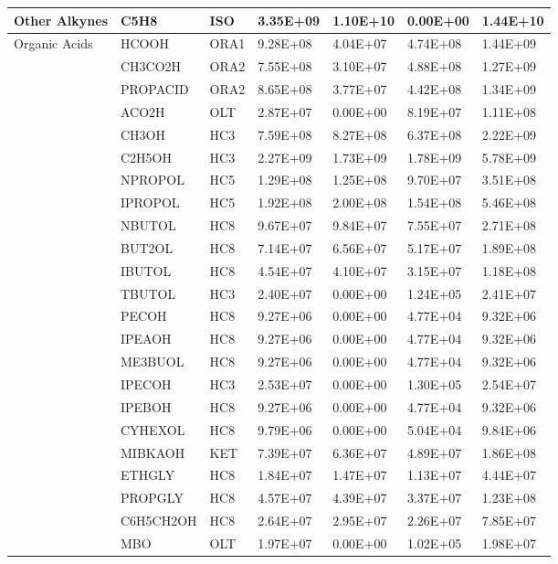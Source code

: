 \begin{longtable}{lllllll}
	Other Alkynes & C5H8 & ISO & 3.35E+09 & 1.10E+10 & 0.00E+00 & 1.44E+10 \\
	\hline \multirow{4}{*}{Organic Acids} & HCOOH & ORA1 & 9.28E+08 & 4.04E+07 & 4.74E+08 & 1.44E+09 \\*
	 & CH3CO2H & ORA2 & 7.55E+08 & 3.10E+07 & 4.88E+08 & 1.27E+09 \\*
	 & PROPACID & ORA2 & 8.65E+08 & 3.77E+07 & 4.42E+08 & 1.34E+09 \\
	 & ACO2H & OLT & 2.87E+07 & 0.00E+00 & 8.19E+07 & 1.11E+08 \\
	\hline \parbox[t]{2mm}{} & CH3OH & HC3 & 7.59E+08 & 8.27E+08 & 6.37E+08 & 2.22E+09 \\
	 & C2H5OH & HC3 & 2.27E+09 & 1.73E+09 & 1.78E+09 & 5.78E+09 \\
	 & NPROPOL & HC5 & 1.29E+08 & 1.25E+08 & 9.70E+07 & 3.51E+08 \\
	 & IPROPOL & HC5 & 1.92E+08 & 2.00E+08 & 1.54E+08 & 5.46E+08 \\
	 & NBUTOL & HC8 & 9.67E+07 & 9.84E+07 & 7.55E+07 & 2.71E+08 \\
	 & BUT2OL & HC8 & 7.14E+07 & 6.56E+07 & 5.17E+07 & 1.89E+08 \\
	 & IBUTOL & HC8 & 4.54E+07 & 4.10E+07 & 3.15E+07 & 1.18E+08 \\
	 & TBUTOL & HC3 & 2.40E+07 & 0.00E+00 & 1.24E+05 & 2.41E+07 \\
	 & PECOH & HC8 & 9.27E+06 & 0.00E+00 & 4.77E+04 & 9.32E+06 \\
	 & IPEAOH & HC8 & 9.27E+06 & 0.00E+00 & 4.77E+04 & 9.32E+06 \\
	 & ME3BUOL & HC8 & 9.27E+06 & 0.00E+00 & 4.77E+04 & 9.32E+06 \\
	 & IPECOH & HC3 & 2.53E+07 & 0.00E+00 & 1.30E+05 & 2.54E+07 \\
	 & IPEBOH & HC8 & 9.27E+06 & 0.00E+00 & 4.77E+04 & 9.32E+06 \\
	 & CYHEXOL & HC8 & 9.79E+06 & 0.00E+00 & 5.04E+04 & 9.84E+06 \\
	 & MIBKAOH & KET & 7.39E+07 & 6.36E+07 & 4.89E+07 & 1.86E+08 \\
	 & ETHGLY & HC8 & 1.84E+07 & 1.47E+07 & 1.13E+07 & 4.44E+07 \\
	 & PROPGLY & HC8 & 4.57E+07 & 4.39E+07 & 3.37E+07 & 1.23E+08 \\
	 & C6H5CH2OH & HC8 & 2.64E+07 & 2.95E+07 & 2.26E+07 & 7.85E+07 \\
	 & MBO & OLT & 1.97E+07 & 0.00E+00 & 1.02E+05 & 1.98E+07 \\

\end{longtable}
